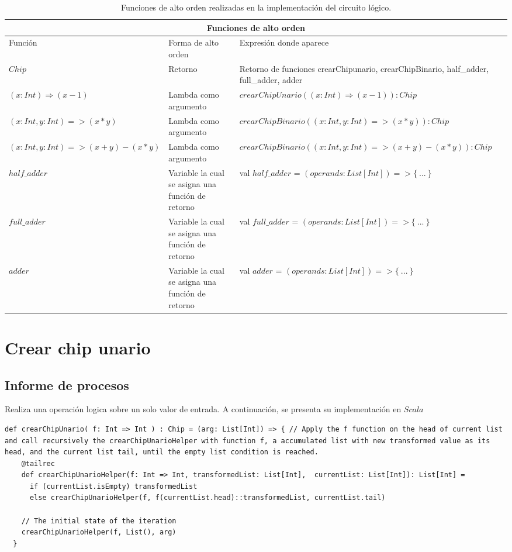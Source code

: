 \documentclass[12pt, a4paper]{article}
\begin{document}
\begin{table}
 \scriptsize
\begin{tabular}{ |p{4cm}||p{3cm}|p{5.5cm}|  }
 \hline
 \multicolumn{3}{|c|}{Funciones de alto orden} \\
 \hline
 Función& Forma de alto orden  & Expresión donde aparece\\
 \hline
  $Chip$ & Retorno & Retorno de funciones crearChipunario, crearChipBinario, half\_adder, full\_adder, adder\\
  \hline
  $(x:Int) \Rightarrow (x - 1)$  & Lambda como argumento &  $crearChipUnario((x:Int) \Rightarrow (x - 1)):Chip$\\
  \hline
  $ (x: Int, y: Int ) => (x * y)$  & Lambda como argumento &  $crearChipBinario((x: Int, y: Int ) => (x * y)): Chip$\\
  \hline
  $(x: Int, y: Int ) => (x + y) - (x * y )$  & Lambda como argumento &  $crearChipBinario((x: Int, y: Int ) => (x + y) - (x * y )): Chip$\\
\hline
  $half\_adder$ & Variable la cual se asigna una función de retorno & val $half\_adder$ = $( operands: List[Int]) => \{~...~ \}$\\
\hline
  $full\_adder$& Variable la cual se asigna una función de retorno  & val $full\_adder$ = $( operands: List[Int]) => \{~...~ \}$\\
\hline
  $adder$& Variable la cual se asigna una función de retorno & val $adder$ = $( operands: List[Int]) => \{~...~ \}$ \\
 \hline
\end{tabular}
\centering
\caption{Funciones de alto orden realizadas en la implementación del circuito lógico.}
\label{tabla:1}
\end{table}

\section{Crear chip unario}
\subsection{Informe de procesos}
Realiza una operación logica sobre un solo valor de entrada. A continuación, se presenta su implementación en $Scala$ \\[16pt]
\begin{lstlisting}[style=scalaStyle, caption=Aplica una operación binaria sobre una valor de entrada.]
  def crearChipUnario( f: Int => Int ) : Chip = (arg: List[Int]) => { // Apply the f function on the head of current list and call recursively the crearChipUnarioHelper with function f, a accumulated list with new transformed value as its head, and the current list tail, until the empty list condition is reached.
    @tailrec
    def crearChipUnarioHelper(f: Int => Int, transformedList: List[Int],  currentList: List[Int]): List[Int] =
      if (currentList.isEmpty) transformedList
      else crearChipUnarioHelper(f, f(currentList.head)::transformedList, currentList.tail)

    // The initial state of the iteration
    crearChipUnarioHelper(f, List(), arg)
  }
\end{lstlisting}
\end{document}
